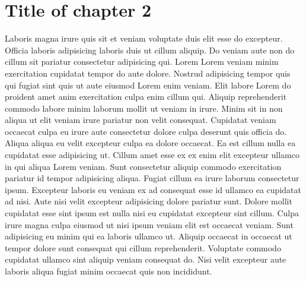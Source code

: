 \chapter{Title of chapter 2}

Laboris magna irure quis sit et veniam voluptate duis elit esse do excepteur. Officia laboris adipisicing laboris duis ut cillum aliquip. Do veniam aute non do cillum sit pariatur consectetur adipisicing qui. Lorem Lorem veniam minim exercitation cupidatat tempor do aute dolore. Nostrud adipisicing tempor quis qui fugiat sint quis ut aute eiusmod Lorem enim veniam. Elit labore Lorem do proident amet anim exercitation culpa enim cillum qui. Aliquip reprehenderit commodo labore minim laborum mollit ut veniam in irure. Minim sit in non aliqua ut elit veniam irure pariatur non velit consequat. Cupidatat veniam occaecat culpa eu irure aute consectetur dolore culpa deserunt quis officia do. Aliqua aliqua eu velit excepteur culpa ea dolore occaecat. Ea est cillum nulla ea cupidatat esse adipisicing ut. Cillum amet esse ex ex enim elit excepteur ullamco in qui aliqua Lorem veniam. Sunt consectetur aliquip commodo exercitation pariatur id tempor adipisicing aliqua. Fugiat cillum ea irure laborum consectetur ipsum. Excepteur laboris eu veniam ex ad consequat esse id ullamco ea cupidatat ad nisi. Aute nisi velit excepteur adipisicing dolore pariatur sunt. Dolore mollit cupidatat esse sint ipsum est nulla nisi eu cupidatat excepteur sint cillum. Culpa irure magna culpa eiusmod ut nisi ipsum veniam elit est occaecat veniam. Sunt adipisicing eu minim qui ea laboris ullamco ut. Aliquip occaecat in occaecat ut tempor dolore sunt consequat qui cillum reprehenderit. Voluptate commodo cupidatat ullamco sint aliquip veniam consequat do. Nisi velit excepteur aute laboris aliqua fugiat minim occaecat quis non incididunt.
